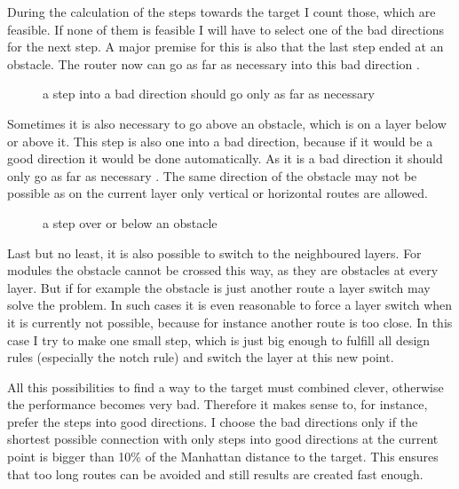 During the calculation of the steps towards the target I count those, which are feasible. If none of them is feasible I will have to select one of the bad directions for the next step. A major premise for this is also that the last step ended at an obstacle. The router now can go as far as necessary into this bad direction .

\begin{figure}
	\centering
	
 	\caption{a step into a bad direction should go only as far as necessary}
	\label{fig:router_as_far_as_necessary}
\end{figure}

Sometimes it is also necessary to go above an obstacle, which is on a layer below or above it. This step is also one into a bad direction, because if it would be a good direction it would be done automatically. As it is a bad direction it should only go as far as necessary . The same direction of the obstacle may not be possible as on the current layer only vertical or horizontal routes are allowed.

\begin{figure}
	\centering
	
 	\caption{a step over or below an obstacle}
	\label{fig:router_as_far_as_necessary_above}
\end{figure}

Last but no least, it is also possible to switch to the neighboured layers. For modules the obstacle cannot be crossed this way, as they are obstacles at every layer. But if for example the obstacle is just another route a layer switch may solve the problem. In such cases it is even reasonable to force a layer switch when it is currently not possible, because for instance another route is too close. In this case I try to make one small step, which is just big enough to fulfill all design rules (especially the notch rule) and switch the layer at this new point.

All this possibilities to find a way to the target must combined clever, otherwise the performance becomes very bad. Therefore it makes sense to, for instance, prefer the steps into good directions. I choose the bad directions only if the shortest possible connection with only steps into good directions at the current point is bigger than 10\% of the Manhattan distance to the target. This ensures that too long routes can be avoided and still results are created fast enough.

